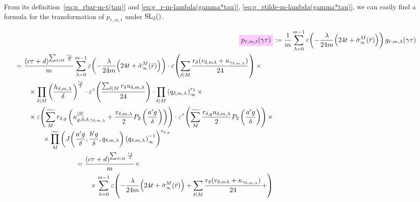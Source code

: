 \documentclass{article}
\begin{document}
From its definition~\eqref{eq:p_rbar-m-t(tau)} and
\eqref{eq:g_r-m-lambda(gamma*tau)},
\eqref{eq:g_rtilde-m-lambda(gamma*tau)}, we can easily find a formula
for the transformation of $p_{\bar{r},m,t}$ under $\SL2Z$.

\begin{align}
  \defineNotation[p-rbar-m-t-gamma-tau]{p_{\bar{r},m,t}(\gamma\tau)}
  &:=\frac{1}{m} \sum_{\lambda=0}^{m-1}
    \unityPower{-\frac{\lambda}{24m}\Bigl(24t+\sigmainftybar[M]{\bar{r}}\Bigr)}
    g_{\bar{r},m,\lambda}(\gamma\tau)
  \notag\\
  \begin{split}
  &=
    \frac{(c\tau+d)^{\divisorsum{M} \frac{r_\delta}{2}}}{m}
    \sum_{\lambda=0}^{m-1}
    \unityPower{-\frac{\lambda}{24m}\Bigl(24t+\sigmainftybar[M]{\bar{r}}\Bigr)}
    \cdot
    \unityPower{\divisorsum{M}\frac{r_\delta(v_{\delta,m\lambda}
                + \kappa_{\gamma_{\delta,m,\lambda}})}{24}}
  \times\\
  & \qquad\times
    \divisorprod{M}
    \left(\frac{h_{\delta,m,\lambda}}{\delta}\right)^{\!\frac{r_\delta}{2}}
    \cdot
    \unityPowerTau{\frac{\divisorsum{M} r_\delta u_{\delta,m,\lambda}}{24}}
    \cdot
    \divisorprod{M}
    \eulerFunction[q_{\delta,m,\lambda}]{}^{r_\delta}
  \times\\
  & \qquad\times
    \unityPower{
      \gensum[M]
      r_{\delta,g}
      \left(
      \kappa_{g,0,\delta,\gamma_{\delta,m,\lambda}}^{[S]}
      +
      \frac{v_{\delta,m,\lambda}}{2} P_2\left(\frac{a' g}{\delta}\right)
      \right)}
  \cdot
  \unityPowerTau{
    \gensum[M]
    \frac{r_{\delta,g} u_{\delta,m,\lambda}}{2} P_2\left(\frac{a' g}{\delta}\right)}
  \times
  \\
  &\qquad\qquad
  \times
  \genprod[M]
  \left(
    \jacobiAlpha{\frac{a' g}{\delta}}{\frac{b' g}{\delta}}{q_{\delta,m,\lambda}}
    \eulerFunction[q_{\delta,m,\lambda}]{}^{-1}
  \right)^{r_{\delta,g}}
  \end{split}
  \notag\\
  \begin{split}
  &=
    \frac{(c\tau+d)^{\divisorsum{M} \frac{r_\delta}{2}}}{m}
  \times\\
  & \qquad\times
  \sum_{\lambda=0}^{m-1}
    \unityPower{-\frac{\lambda}{24m}\Bigl(24t+\sigmainftybar[M]{\bar{r}}\Bigr)
      + \divisorsum{M}\frac{r_\delta(v_{\delta,m\lambda}
        + \kappa_{\gamma_{\delta,m,\lambda}})}{24}
      +
}
\end{split}
\end{align}
\end{document}
